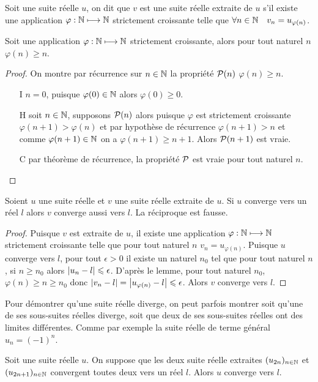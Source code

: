 \begin{defdef}
  Soit une suite réelle $u$, on dit que $v$ est une suite réelle extraite de $u$ s'il existe une application $\varphi:\N \longmapsto \N$ strictement croissante telle que $\forall n\in \N \quad v_n=u_{\varphi(n)}$.
\end{defdef}
\begin{lemme}
  Soit une application $\varphi:\N \longmapsto \N$ strictement croissante, alors pour tout naturel $n$ $\varphi(n) \geqslant n$.
\end{lemme}
\begin{proof}
  On montre par récurrence sur $n \in \N$ la propriété $\P(n)$ $\varphi(n) \geqslant n$.
  \begin{itemize}
  \item[I] $n=0$, puisque $\varphi(0) \in \N$ alors $\varphi(0) \geqslant 0$.
  \item[H] soit $n \in \N$, supposons $\P(n)$ alors puisque $\varphi$ est strictement croissante $\varphi(n+1) > \varphi(n)$ et par hypothèse de récurrence $\varphi(n+1) > n$ et comme $\varphi(n+1) \in \N$ on a $\varphi(n+1) \geqslant n+1$. Alors $\P(n+1)$ est vraie.
  \item[C] par théorème de récurrence, la propriété $\P$ est vraie pour tout naturel $n$.
  \end{itemize}
\end{proof}
\begin{prop}
  Soient $u$ une suite réelle et $v$ une suite réelle extraite de $u$. Si $u$ converge vers un réel $l$ alors $v$ converge aussi vers $l$. La réciproque est fausse.
\end{prop}
\begin{proof}
  Puisque $v$ est extraite de $u$, il existe une application $\varphi:\N \longmapsto \N$ strictement croissante telle que pour tout naturel $n$ $v_n=u_{\varphi(n)}$. Puisque $u$ converge vers $l$, pour tout $\epsilon>0$ il existe un naturel $n_0$ tel que pour tout naturel $n$, si $n \geqslant n_0$ alors $\abs{u_n-l} \leqslant \epsilon$. D'après le lemme, pour tout naturel $n_0$, $\varphi(n) \geqslant n \geqslant n_0$ donc $\abs{v_n-l}=\abs{u_{\varphi(n)}-l} \leqslant \epsilon$. Alors $v$ converge vers $l$.
\end{proof}
Pour démontrer qu'une suite réelle diverge, on peut parfois montrer soit qu'une de ses sous-suites réelles diverge, soit que deux de ses sous-suites réelles ont des limites différentes. Comme par exemple la suite réelle de terme général $u_n=(-1)^n$.
\begin{prop}
  Soit une suite réelle $u$. On suppose que les deux suite réelle extraites $(u_{2n})_{n \in \N}$ et $(u_{2n+1})_{n \in \N}$ convergent toutes deux vers un réel $l$. Alors $u$ converge vers $l$.
\end{prop}
